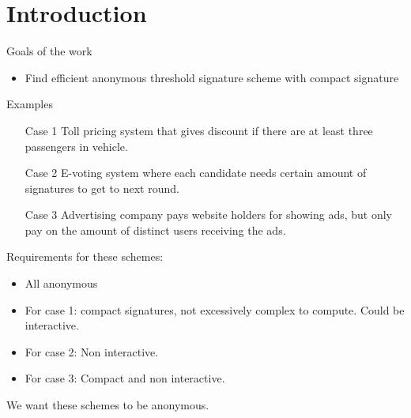 \section{Introduction}
\begin{frame}{Goals of the work}
\begin{itemize}
\item Find efficient anonymous threshold signature scheme with compact signature
\end{itemize}
\end{frame}

\begin{frame}{Examples}
\begin{itemize}
\item[Case 1] Toll pricing system that gives discount if there are at least three passengers in vehicle.
\item[Case 2] E-voting system where each candidate needs certain amount of signatures to get to next round.
\item[Case 3] Advertising company pays website holders for showing ads, but only pay on the amount of distinct users receiving the ads.
\end{itemize}

\end{frame}

\begin{frame}
Requirements for these schemes:
\begin{itemize}
\item All anonymous
\item For case 1: compact signatures, not excessively complex to compute. Could be interactive.
\item For case 2: Non interactive.
\item For case 3: Compact and non interactive.
\end{itemize}
We want these schemes to be anonymous.
\end{frame}